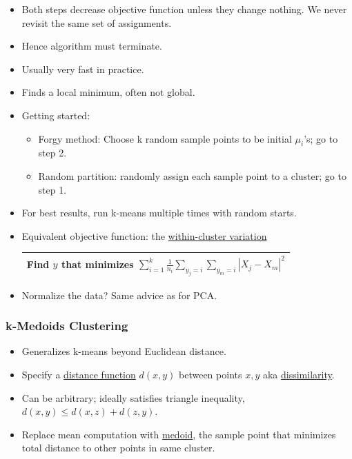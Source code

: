 \documentclass[10pt]{article}
\begin{document}
\begin{itemize}
\begin{center}
		\end{center}
		\item Both steps decrease objective function unless they change nothing. We never revisit the same set of assignments.
		\item Hence algorithm must terminate.
		\item Usually very fast in practice.
		\item Finds a local minimum, often not global.
		\item Getting started:
			\begin{itemize}
				\item Forgy method: Choose k random sample points to be initial $\mu_{i}$'s; go to step 2.
				\item Random partition: randomly assign each sample point to a cluster; go to step 1.
			\end{itemize}
		\item For best results, run k-means multiple times with random starts.
		\item Equivalent objective function: the \underline{within-cluster variation}
			\begin{center}
		\begin{tabular}{|c|}
			\hline
			Find $y$ that minimizes $\sum_{i=1}^{k} \frac{1}{n_{i}}\sum_{y_{j}=i}\sum_{y_{m}=i} |X_{j} - X_{m}|^{2}$ \\
			\hline
		\end{tabular}
		\end{center}
		\item Normalize the data? Same advice as for PCA. 
\end{itemize}

\subsubsection*{k-Medoids Clustering}
\begin{itemize}
	\item Generalizes k-means beyond Euclidean distance.
	\item Specify a \underline{distance function} $d(x, y)$ between points $x, y$ aka \underline{dissimilarity}.
	\item Can be arbitrary; ideally satisfies triangle inequality, $d(x, y) \leq d(x, z) + d(z, y)$.
	\item Replace mean computation with \underline{medoid}, the sample point that minimizes total distance to other points in same cluster.
\end{itemize}
\end{document}
